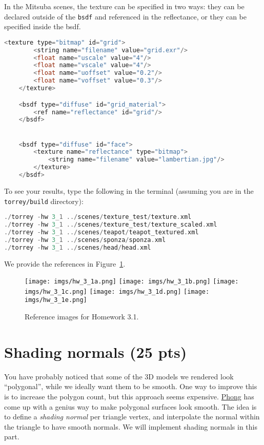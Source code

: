 In the Mitsuba scenes, the texture can be specified in two ways: they can be declared outside of the \lstinline{bsdf} and referenced in the reflectance, or they can be specified inside the bsdf.
\begin{lstlisting}[language=C++]
    <texture type="bitmap" id="grid">
        <string name="filename" value="grid.exr"/>
        <float name="uscale" value="4"/>
        <float name="vscale" value="4"/>
        <float name="uoffset" value="0.2"/>
        <float name="voffset" value="0.3"/>
    </texture>

    <bsdf type="diffuse" id="grid_material">
        <ref name="reflectance" id="grid"/>
    </bsdf>


    <bsdf type="diffuse" id="face">
        <texture name="reflectance" type="bitmap">
            <string name="filename" value="lambertian.jpg"/>
        </texture>
    </bsdf>
\end{lstlisting}

To see your results, type the following in the terminal (assuming you are in the \lstinline{torrey/build} directory):
\begin{lstlisting}[language=C++]
./torrey -hw 3_1 ../scenes/texture_test/texture.xml
./torrey -hw 3_1 ../scenes/texture_test/texture_scaled.xml
./torrey -hw 3_1 ../scenes/teapot/teapot_textured.xml
./torrey -hw 3_1 ../scenes/sponza/sponza.xml
./torrey -hw 3_1 ../scenes/head/head.xml
\end{lstlisting}
We provide the references in Figure~\ref{fig:hw_3_1}.

\begin{figure}[ht]
    \centering
    \texttt{[image: imgs/hw\_3\_1a.png]}
    \texttt{[image: imgs/hw\_3\_1b.png]}
    \texttt{[image: imgs/hw\_3\_1c.png]}
    \texttt{[image: imgs/hw\_3\_1d.png]}
    \texttt{[image: imgs/hw\_3\_1e.png]}
    \caption{Reference images for Homework 3.1.}
    \label{fig:hw_3_1}
\end{figure}

\section{Shading normals (25 pts)}
You have probably noticed that some of the 3D models we rendered look ``polygonal'', while we ideally want them to be smooth. One way to improve this is to increase the polygon count, but this approach seems expensive. \href{https://en.wikipedia.org/wiki/Phong_shading}{Phong} has come up with a genius way to make polygonal surfaces look smooth. The idea is to define a \emph{shading normal} per triangle vertex, and interpolate the normal within the triangle to have smooth normals. We will implement shading normals in this part.

